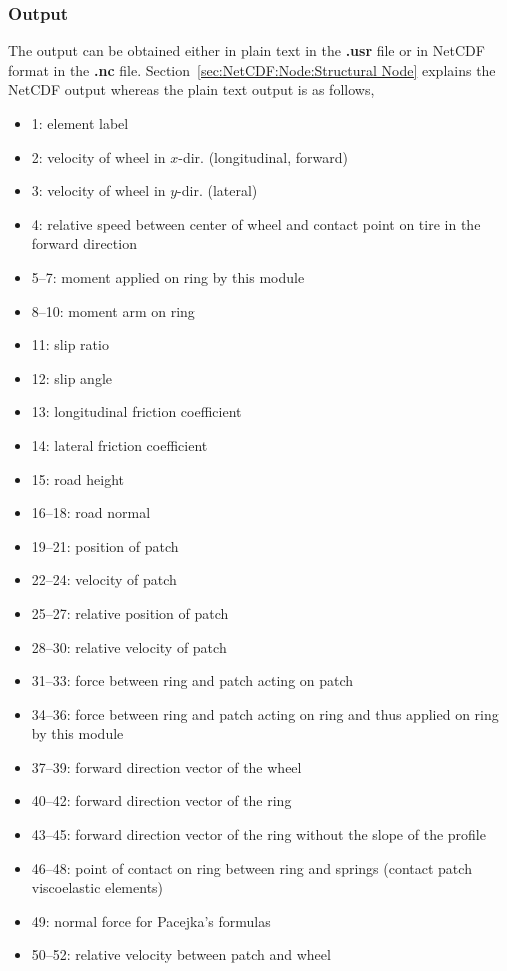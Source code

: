 \subsubsection{Output}
The output can be obtained either in plain text in the \textbf{.usr} file or in NetCDF format in the \textbf{.nc} file. Section~\ref{sec:NetCDF:Node:Structural Node} explains the NetCDF output whereas the plain text output is as follows,
\begin{itemize}
\item 1: element label
\item 2: velocity of wheel in $x$-dir. (longitudinal, forward)
\item 3: velocity of wheel in $y$-dir. (lateral)
\item 4: relative speed between center of wheel and contact point on tire in the forward direction
\item 5--7: moment applied on ring by this module
\item 8--10: moment arm on ring
\item 11: slip ratio
\item 12: slip angle
\item 13: longitudinal friction coefficient
\item 14: lateral friction coefficient
\item 15: road height
\item 16--18: road normal
\item 19--21: position of patch
\item 22--24: velocity of patch
\item 25--27: relative position of patch
\item 28--30: relative velocity of patch
\item 31--33: force between ring and patch acting on patch
\item 34--36: force between ring and patch acting on ring and thus applied on ring by this module
\item 37--39: forward direction vector of the wheel
\item 40--42: forward direction vector of the ring
\item 43--45: forward direction vector of the ring without the slope of the profile
\item 46--48: point of contact on ring between ring and springs (contact patch viscoelastic elements)
\item 49: normal force for Pacejka's formulas
\item 50--52: relative velocity between patch and wheel

\end{itemize}
